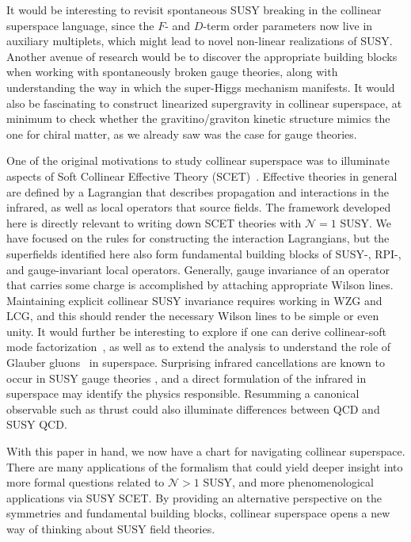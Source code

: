 \documentclass[12pt,document,nofootinbib,superscriptaddress,onecolumn,preprintnumbers,balancelastpage]{article}
\begin{document}
\begin{spacing}{1.2}
It would be interesting to revisit spontaneous SUSY breaking in the collinear superspace language, since the $F$- and $D$-term order parameters now live in auxiliary multiplets, which might lead to novel non-linear realizations of SUSY.
%
Another avenue of research would be to discover the appropriate building blocks when working with spontaneously broken gauge theories, along with understanding the way in which the super-Higgs mechanism manifests.
%
It would also be fascinating to construct linearized supergravity in collinear superspace, at minimum to check whether the gravitino/graviton kinetic structure mimics the one for chiral matter, as we already saw was the case for gauge theories.


One of the original motivations to study collinear superspace was to illuminate aspects of Soft Collinear Effective Theory (SCET)~\cite{Bauer:2000yr, Bauer:2001ct, Bauer:2001yt}.
%
Effective theories in general are defined by a Lagrangian that describes propagation and interactions in the infrared, as well as local operators that source fields.
%
The framework developed here is directly relevant to writing down SCET theories with $\mathcal{N} = 1$ SUSY.  
%
We have focused on the rules for constructing the interaction Lagrangians, but the superfields identified here also form fundamental building blocks of SUSY-, RPI-, and gauge-invariant local operators.
%
Generally, gauge invariance of an operator that carries some charge is accomplished by attaching appropriate Wilson lines.
%
Maintaining explicit collinear SUSY invariance requires working in WZG and LCG, and this should render the necessary Wilson lines to be simple or even unity.
%
It would further be interesting to explore if one can derive collinear-soft mode factorization~\cite{Bauer:2002nz}, as well as to extend the analysis to understand the role of Glauber gluons~\cite{Rothstein:2016bsq} in superspace.
%
Surprising infrared cancellations are known to occur in SUSY gauge theories \cite{Dine:2016rxc}, and a direct formulation of the infrared in superspace may identify the physics responsible.
%
Resumming a canonical observable such as thrust could also illuminate differences between QCD and SUSY QCD.
%


With this paper in hand, we now have a chart for navigating collinear superspace.
%
There are many applications of the formalism that could yield deeper insight into more formal questions related to $\mathcal{N} > 1$ SUSY, and more phenomenological applications via SUSY SCET.
%
By providing an alternative perspective on the symmetries and fundamental building blocks, collinear superspace opens a new way of thinking about SUSY field theories.




\end{spacing}
\end{document}
